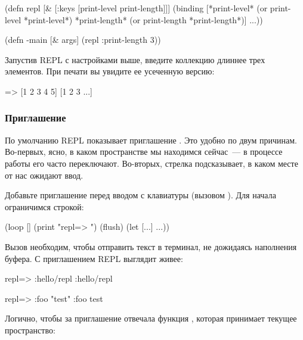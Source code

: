 \begin{english}
  \begin{clojure}
(defn repl [& [{:keys [print-level
                       print-length]}]]
  (binding [*print-level*
            (or print-level *print-level*)
            *print-length*
            (or print-length *print-length*)]
    ...))

(defn -main [& args]
  (repl {:print-length 3}))
  \end{clojure}
\end{english}

Запустив REPL с настройками выше, введите коллекцию длиннее трех элементов. При печати вы увидите ее усеченную версию:

\begin{english}
  \begin{clojure}
=> [1 2 3 4 5]
[1 2 3 ...]
  \end{clojure}
\end{english}

\subsubsection{Приглашение}

По умолчанию REPL показывает приглашение . Это удобно по двум причинам. Во-первых, ясно, в каком пространстве мы находимся сейчас~--- в процессе работы его часто переключают. Во-вторых, стрелка подсказывает, в каком месте от нас ожидают ввод.

Добавьте приглашение перед вводом с клавиатуры (вызовом ). Для начала ограничимся строкой:

\begin{english}
  \begin{clojure}
(loop []
  (print "repl=> ")
  (flush)
  (let [...]
    ...))
  \end{clojure}
\end{english}

Вызов  необходим, чтобы отправить текст в терминал, не дожидаясь наполнения буфера. С приглашением REPL выглядит живее:

\begin{english}
  \begin{clojure}
repl=> :hello/repl
:hello/repl

repl=> {:foo "test"}
{:foo test}
  \end{clojure}
\end{english}

Логично, чтобы за приглашение отвечала функция , которая принимает текущее пространство:


